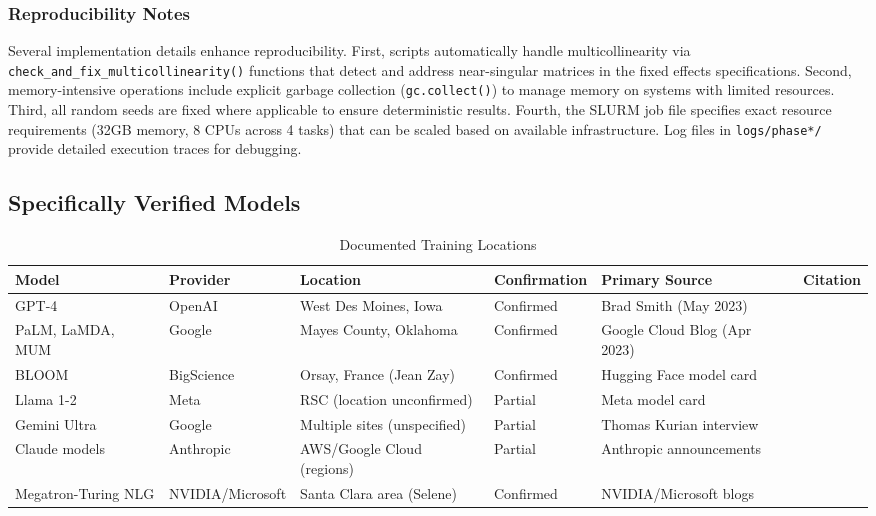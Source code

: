 \documentclass[sigconf]{acmart}
\begin{document}
\subsubsection{Reproducibility Notes}
\label{appendix:reproducibility}

Several implementation details enhance reproducibility. First, scripts automatically handle multicollinearity via \texttt{check\_and\_fix\_multicollinearity()} functions that detect and address near-singular matrices in the fixed effects specifications. Second, memory-intensive operations include explicit garbage collection (\texttt{gc.collect()}) to manage memory on systems with limited resources. Third, all random seeds are fixed where applicable to ensure deterministic results. Fourth, the SLURM job file specifies exact resource requirements (32GB memory, 8 CPUs across 4 tasks) that can be scaled based on available infrastructure. Log files in \texttt{logs/phase*/} provide detailed execution traces for debugging.

\subsection{Specifically Verified Models}

\begin{table}[htbp]
\centering
\caption{Documented Training Locations}
\label{tab:training_locations}
\begin{tabular}{@{}llllll@{}}
\toprule
Model & Provider & Location & Confirmation & Primary Source & Citation \\
\midrule
GPT-4 & OpenAI & West Des Moines, Iowa & Confirmed & Brad Smith (May 2023) & \cite{smith2023iowa} \\
PaLM, LaMDA, MUM & Google & Mayes County, Oklahoma & Confirmed & Google Cloud Blog (Apr 2023) & \cite{googlecloud2023mlhub} \\
BLOOM & BigScience & Orsay, France (Jean Zay) & Confirmed & Hugging Face model card & \cite{luccioni2022bloom} \\
Llama 1-2 & Meta & RSC (location unconfirmed) & Partial & Meta model card & \cite{hpcwire2023rsc} \\
Gemini Ultra & Google & Multiple sites (unspecified) & Partial & Thomas Kurian interview & \cite{kurian2023dcd} \\
Claude models & Anthropic & AWS/Google Cloud (regions) & Partial & Anthropic announcements & \cite{anthropic2025infrastructure} \\
Megatron-Turing NLG & NVIDIA/Microsoft & Santa Clara area (Selene) & Confirmed & NVIDIA/Microsoft blogs & \cite{nvidia2021megatron} \\
\bottomrule
\end{tabular}
\end{table}
\end{document}
